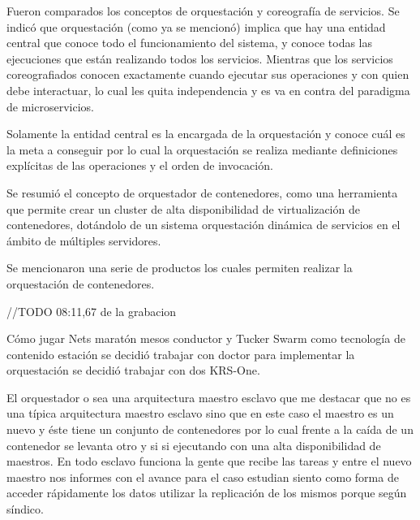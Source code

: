 Fueron comparados los conceptos de orquestación y coreografía de servicios. Se indicó que orquestación (como ya se mencionó) implica que hay una entidad central que conoce todo el funcionamiento del sistema, y conoce todas las ejecuciones que están realizando todos los servicios. Mientras que los servicios coreografiados conocen exactamente cuando ejecutar sus operaciones y con quien debe interactuar, lo cual les quita independencia y es va en contra del paradigma de microservicios. 

Solamente la entidad central es la encargada de la orquestación y conoce cuál es la meta a conseguir por lo cual la orquestación se realiza mediante definiciones explícitas de las operaciones y el orden de invocación. 
 
 
 Se resumió el concepto de orquestador de contenedores, como una herramienta que permite crear un cluster de alta disponibilidad de virtualización de contenedores, dotándolo de un sistema orquestación dinámica de servicios en el ámbito de múltiples servidores.

 Se mencionaron una serie de productos los cuales permiten realizar la orquestación de contenedores. 
 

//TODO  08:11,67 de la grabacion 

 Cómo jugar Nets maratón mesos conductor y Tucker Swarm como tecnología de contenido estación se decidió trabajar con doctor para implementar la orquestación se decidió trabajar con dos KRS-One. 
 
 
 El orquestador o sea una arquitectura maestro esclavo que me destacar que no es una típica arquitectura maestro esclavo sino que en este caso el maestro es un nuevo y éste tiene un conjunto de contenedores por lo cual frente a la caída de un contenedor se levanta otro y si si ejecutando con una alta disponibilidad de maestros.
  En todo esclavo funciona la gente que recibe las tareas y entre el nuevo maestro nos informes con el avance para el caso estudian siento como forma de acceder rápidamente los datos utilizar la replicación de los mismos porque según síndico. 
  

